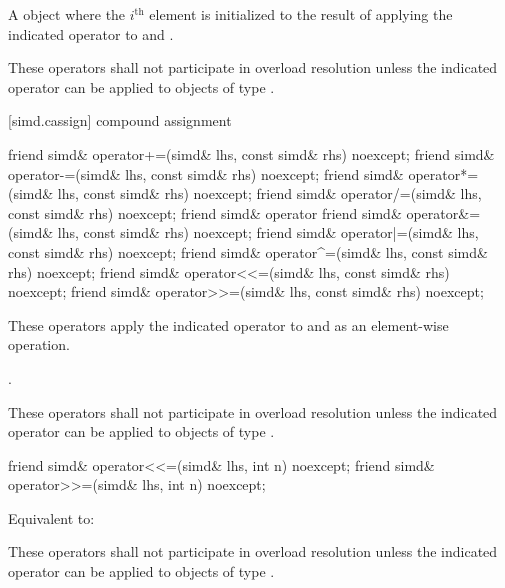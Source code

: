 \begin{itemdescr}
  \pnum\returns
  A  object where the $i^\text{th}$ element is initialized to the result of applying the indicated operator to  and  \foralli.

  \pnum\remarks
  These operators shall not participate in overload resolution unless the indicated operator can be applied to objects of type .
\end{itemdescr}

[simd.cassign]{ compound assignment}

\begin{itemdecl}
friend simd& operator+=(simd& lhs, const simd& rhs) noexcept;
friend simd& operator-=(simd& lhs, const simd& rhs) noexcept;
friend simd& operator*=(simd& lhs, const simd& rhs) noexcept;
friend simd& operator/=(simd& lhs, const simd& rhs) noexcept;
friend simd& operator%
friend simd& operator&=(simd& lhs, const simd& rhs) noexcept;
friend simd& operator|=(simd& lhs, const simd& rhs) noexcept;
friend simd& operator^=(simd& lhs, const simd& rhs) noexcept;
friend simd& operator<<=(simd& lhs, const simd& rhs) noexcept;
friend simd& operator>>=(simd& lhs, const simd& rhs) noexcept;
\end{itemdecl}

\begin{itemdescr}
  \pnum\effects
  These operators apply the indicated operator to  and  as an element-wise operation.

  \pnum\returns
  .

  \pnum\remarks
  These operators shall not participate in overload resolution unless the indicated operator can be applied to objects of type .
\end{itemdescr}

\begin{itemdecl}
friend simd& operator<<=(simd& lhs, int n) noexcept;
friend simd& operator>>=(simd& lhs, int n) noexcept;
\end{itemdecl}

\begin{itemdescr}
  \pnum\effects
  Equivalent to: 

  \pnum\remarks
  These operators shall not participate in overload resolution unless the indicated operator can be applied to objects of type .
\end{itemdescr}

